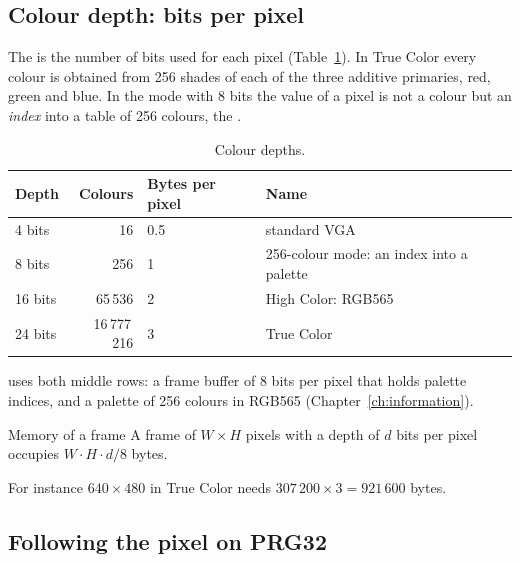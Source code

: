 \subsection{Colour depth: bits per pixel}

The  is the number of bits used for each pixel
(Table~\ref{tab:vid:depth}). In True Color every colour is obtained from 256
shades of each of the three additive primaries, red, green and blue. In the
mode with 8 bits the value of a pixel is not a colour but an \emph{index}
into a table of 256 colours, the .

\begin{table}[htb]
\centering\small
\caption{Colour depths.}\label{tab:vid:depth}
\begin{tabular}{@{}lrll@{}}
\toprule
\textbf{Depth} & \textbf{Colours} & \textbf{Bytes per pixel} & \textbf{Name}\\
\midrule
4 bits & 16 & 0.5 & standard VGA\\
8 bits & 256 & 1 & 256-colour mode: an index into a palette\\
16 bits & 65\,536 & 2 & High Color: RGB565\\
24 bits & 16\,777\,216 & 3 & True Color\\
\bottomrule
\end{tabular}
\end{table}

\prg uses both middle rows: a frame buffer of 8 bits per pixel that holds
palette indices, and a palette of 256 colours in RGB565
(Chapter~\ref{ch:information}).

\begin{theorem}{Memory of a frame}
A frame of $W\times H$ pixels with a depth of $d$ bits per pixel occupies
$W\cdot H\cdot d/8$ bytes.
\end{theorem}

For instance $640\times 480$ in True Color needs
$307\,200\times 3 = 921\,600$ bytes.

\subsection{Following the pixel on PRG32}

